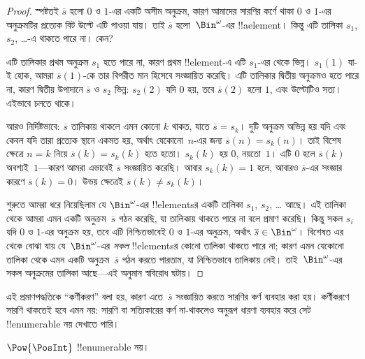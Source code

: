 \documentclass[../../../include/open-logic-section]{subfiles}
\begin{document}
\begin{proof}
স্পষ্টতই $\overline{s}$ হলো $0$ ও $1$-এর একটি অসীম অনুক্রম, কারণ আমাদের সারণির কর্ণে থাকা $0$ ও $1$-এর অনুক্রমটির প্রত্যেক বিট উল্টে এটি পাওয়া যায়। তাই $\overline{s}$ হলো~$\Bin^\omega$-এর !!a{element}। কিন্তু এটি তালিকা $s_1$, $s_2$, \dots{}-এ থাকতে পারে না। কেন?

এটি তালিকার প্রথম অনুক্রম $s_1$ হতে পারে না, কারণ প্রথম !!{element}-এ এটি $s_1$-এর থেকে ভিন্ন। $s_1(1)$ যা-ই হোক, আমরা $\overline{s}(1)$-কে তার বিপরীত মান হিসেবে সংজ্ঞায়িত করেছি। এটি তালিকার দ্বিতীয় অনুক্রমও হতে পারে না, কারণ দ্বিতীয় উপাদানে $\overline{s}$ ও $s_2$ ভিন্ন: $s_2(2)$ যদি $0$ হয়, তবে $\overline{s}(2)$ হলো $1$, এবং উল্টোটিও সত্য। এইভাবে চলতে থাকে।

আরও নির্দিষ্টভাবে: $\overline{s}$ তালিকায় থাকলে এমন কোনো $k$ থাকত, যাতে $\overline{s} = s_{k}$। দুটি অনুক্রম অভিন্ন হয় যদি এবং কেবল যদি তারা প্রত্যেক স্থানে একমত হয়, অর্থাৎ যেকোনো~$n$-এর জন্য $\overline{s}(n) = s_{k}(n)$। তাই বিশেষ ক্ষেত্রে $n = k$ নিয়ে $\overline{s}(k) = s_{k}(k)$ হতে হতো। $s_k(k)$ হয় $0$, নয়তো~$1$। এটি $0$ হলে $\overline{s}(k)$ অবশ্যই~$1$—কারণ আমরা এভাবেই $\overline{s}$ সংজ্ঞায়িত করেছি। আবার $s_k(k) = 1$ হলে, আবারও $\overline{s}$-এর সংজ্ঞার কারণে $\overline{s}(k) = 0$। উভয় ক্ষেত্রেই $\overline{s}(k) \neq s_{k}(k)$।

শুরুতে আমরা ধরে নিয়েছিলাম যে $\Bin^\omega$-এর !!{element}sর একটি তালিকা $s_1$, $s_2$, \dots{} আছে। এই তালিকা থেকে আমরা এমন একটি অনুক্রম~$\overline{s}$ গঠন করেছি, যা তালিকায় থাকতে পারে না বলে প্রমাণ করেছি। কিন্তু সকল $s_i$ যদি $0$ ও $1$-এর অনুক্রম হয়, তবে এটি নিশ্চিতভাবেই $0$ ও $1$-এর অনুক্রম, অর্থাৎ $\overline{s} \in \Bin^\omega$। বিশেষত এর থেকে বোঝা যায় যে~$\Bin^\omega$-এর \emph{সকল} !!{element}sর কোনো তালিকা থাকতে পারে না; কারণ এমন যেকোনো তালিকা থেকে এমন একটি অনুক্রম~$\overline{s}$ গঠন করতে পারতাম, যা নিশ্চিতভাবে তালিকায় নেই। তাই~$\Bin^\omega$-এর সকল অনুক্রমের তালিকা আছে—এই অনুমান স্ববিরোধ ঘটায়।
\end{proof}

\begin{explain}
এই প্রমাণপদ্ধতিকে ``কর্ণীকরণ'' বলা হয়, কারণ এতে~$\overline{s}$ সংজ্ঞায়িত করতে সারণির কর্ণ ব্যবহার করা হয়। কর্ণীকরণে সারণি থাকতেই হবে এমন নয়: সারণি বা সত্যিকারের কর্ণ না-থাকলেও অনুরূপ ধারণা ব্যবহার করে সেট !!{enumerable} নয় দেখাতে পারি।
\end{explain}

\begin{thm}
$\Pow{\PosInt}$ !!{enumerable} নয়।
\end{thm}
\end{document}
